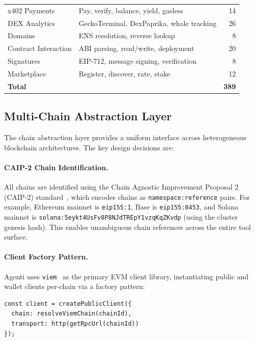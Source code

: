 \documentclass[11pt]{article}
\begin{document}
\begin{table}[t]
\begin{tabular}{@{}llr@{}}
x402 Payments         & Pay, verify, balance, yield, gasless           & 14 \\
DEX Analytics         & GeckoTerminal, DexPaprika, whale tracking     & 26 \\
Domains               & ENS resolution, reverse lookup                & 8  \\
Contract Interaction  & ABI parsing, read/write, deployment           & 20 \\
Signatures            & EIP-712, message signing, verification        & 8  \\
Marketplace           & Register, discover, rate, stake                & 12 \\
\midrule
\textbf{Total}        &                                               & \textbf{389} \\
\bottomrule
\end{tabular}
\end{table}

\subsection{Multi-Chain Abstraction Layer}
\label{sec:multichain}

The chain abstraction layer provides a uniform interface across heterogeneous blockchain architectures. The key design decisions are:

\paragraph{CAIP-2 Chain Identification.} All chains are identified using the Chain Agnostic Improvement Proposal 2 (CAIP-2) standard~\cite{caip2}, which encodes chains as \texttt{namespace:reference} pairs. For example, Ethereum mainnet is \texttt{eip155:1}, Base is \texttt{eip155:8453}, and Solana mainnet is \texttt{solana:5eykt4UsFv8P8NJdTREpY1vzqKqZKvdp} (using the cluster genesis hash). This enables unambiguous chain references across the entire tool surface.

\paragraph{Client Factory Pattern.} Agenti uses \texttt{viem}~\cite{viem} as the primary EVM client library, instantiating public and wallet clients per-chain via a factory pattern:

\begin{lstlisting}[caption={Chain-specific client instantiation.},label={lst:client}]
const client = createPublicClient({
  chain: resolveViemChain(chainId),
  transport: http(getRpcUrl(chainId))
});
\end{lstlisting}
\end{document}
